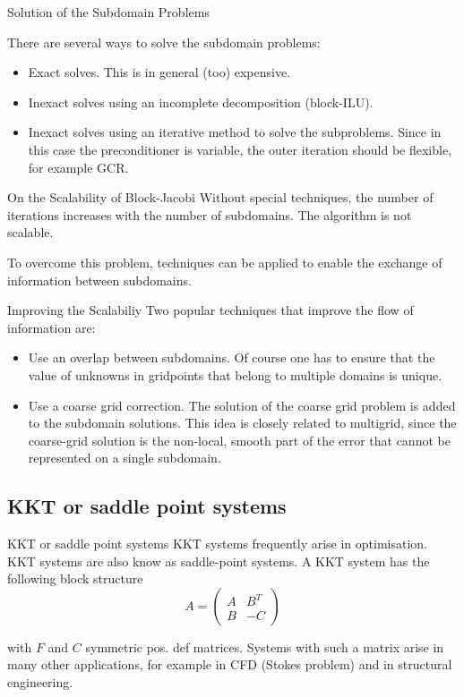 \begin{frame}{Solution of the Subdomain Problems}

  There are several ways to solve the subdomain problems:
  \begin{itemize}
  \item  Exact solves. This is in general (too) expensive.
\item Inexact solves using an incomplete decomposition
(block-ILU).
\item Inexact solves using an iterative method to solve the
subproblems. Since in this case the preconditioner is
variable, the outer iteration should be flexible, for example
GCR.
  \end{itemize}
\end{frame}

\begin{frame}{On the Scalability of Block-Jacobi}
  Without special techniques, the number of iterations increases
  with the number of subdomains. The algorithm is not scalable.

To overcome this problem, techniques can be applied to enable
the exchange of information between subdomains.
\end{frame}

\begin{frame}{Improving the Scalabiliy}
  Two popular techniques that improve the flow of information are:
  \begin{itemize}
  \item Use an overlap between subdomains. Of course one has to
ensure that the value of unknowns in gridpoints that belong
to multiple domains is unique.
\item Use a coarse grid correction. The solution of the coarse grid
problem is added to the subdomain solutions.
This idea is closely related to multigrid, since the coarse-grid
solution is the non-local, smooth part of the error that cannot
be represented on a single subdomain.

  \end{itemize}


\end{frame}
\subsection{KKT or saddle point systems}
\begin{frame}{KKT or saddle point systems}
  KKT systems frequently arise in optimisation. KKT systems are
also know as saddle-point systems. A KKT system has the
following block structure
\begin{equation*}
  A=
  \begin{pmatrix}
    A & B^T\\
    B & -C
  \end{pmatrix}

\end{equation*}

with $F$ and $C$ symmetric pos. def matrices.
Systems with such a matrix arise in many other applications, for
example in CFD (Stokes problem) and in structural engineering.
\end{frame}

